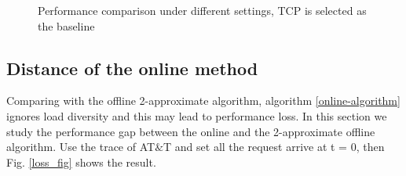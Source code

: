 \documentclass{IEEEtran}
\begin{document}
\begin{figure}[!t]
\centering
{}
\hspace{0.1in}
\hspace{0.1in}
\caption{Performance comparison under different settings, TCP is selected as the baseline}
\label{settings_fig}
\vspace{-0.1 in}
\end{figure}

\subsection{Distance of the online method}


Comparing with the offline 2-approximate algorithm, 
algorithm \ref{online-algorithm} ignores load diversity and this may lead to performance loss. 
In this section we study the performance gap between the online and the 2-approximate offline algorithm. 
Use the trace of AT$\&$T and set all the request arrive at t = 0, then Fig. \ref{loss_fig} shows the result.
\end{document}

